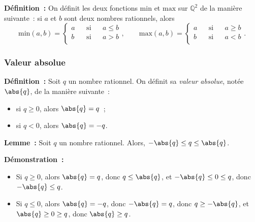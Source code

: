     \done

\medskip

\noindent\textbf{Définition :} On définit les deux fonctions $\mathrm{min}$ et $\mathrm{max}$ sur $\mathbb{Q}^2$ de la manière suivante : si $a$ et $b$ sont deux nombres rationnels, alors 
\begin{equation*}
    \mathrm{min}(a,b) = \left\lbrace \begin{aligned}
        a & & \text{si} & & a \leq b \\
        b & & \text{si} & & a > b \\
    \end{aligned} \right. 
    , \qquad
    \mathrm{max}(a,b) = \left\lbrace \begin{aligned}
        a & & \text{si} & & a \geq b \\
        b & & \text{si} & & a < b \\
    \end{aligned} \right. 
    .
\end{equation*}

\subsubsection{Valeur absolue}

\noindent\textbf{Définition :}  Soit $q$ un nombre rationnel. 
    On définit sa \emph{valeur absolue}, notée $\abs{q}$, de la manière suivante : 
    \begin{itemize}[nosep]
        \item si $q \geq 0$, alors $\abs{q} = q$ ; 
        \item si $q < 0$, alors $\abs{q} = -q$.
    \end{itemize}

\medskip

\noindent\textbf{Lemme :} Soit $q$ un nombre rationnel.
    Alors, $- \abs{q} \leq q \leq \abs{q}$.

\medskip

\noindent\textbf{Démonstration :} 
    \begin{itemize}
        \item Si $q \geq 0$, alors $\abs{q} = q$, donc $q \leq \abs{q}$, et $-\abs{q} \leq 0 \leq q$, donc $- \abs{q} \leq q$.
        \item Si $q \leq 0$, alors $\abs{q} = -q$, donc $-\abs{q} = q$, donc $q \geq -\abs{q}$, et $\abs{q} \geq 0 \geq q$, donc $\abs{q} \geq q$.
    \end{itemize}

